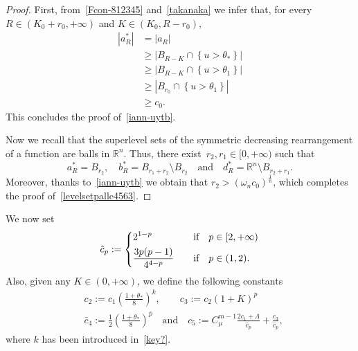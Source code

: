 \documentclass[12pt]{article}
\newcommand{\R}{\mathbb{R}}
\numberwithin{equation}{section}
\renewcommand{\geq}{\geqslant}
\begin{document}
\begin{proof}
First, from~\eqref{Fcon-812345} and~\eqref{takanaka} we infer that, for every~$R\in\left(K_0+r_0,+\infty\right)$ and $K\in (K_0,R-r_0)$,
\begin{equation*}
\begin{split}
\left|a_R^*\right| & =\left|a_R\right|\\ 
&\geq \left|B_{R-K}\cap \left\lbrace u>\theta_{*} \right\rbrace\right|\\
&\geq \left|B_{R-K}\cap \left\lbrace u>\theta_1 \right\rbrace\right|\\
&\geq \left|B_{r_0}\cap \left\lbrace u>\theta_1 \right\rbrace\right|\\
&\geq c_0. 
\end{split}
\end{equation*}
This concludes the proof of~\eqref{iann-uytb}. 

Now we recall that the superlevel sets of the symmetric decreasing rearrangement of a function are balls in $\R^n$. Thus, there exist~$r_2,r_1\in [0,+\infty)$ such that 
\begin{equation*}
a_R^*=B_{r_2}, \quad b_R^*=B_{r_1+r_2}\setminus B_{r_2}\quad\mbox{and}\quad d_R^*=\R^n\setminus B_{r_2+r_1}.
\end{equation*}
Moreover, thanks to~\eqref{iann-uytb} we obtain that $r_2> \left(\omega_n c_0\right)^\frac{1}{n}$, which completes the proof of~\eqref{levelsetpalle4563}. 
\end{proof}

We now set
\begin{equation}\label{red-g-poi}
\hat{c}_p:=\begin{dcases}
2^{1-p}\quad &\mbox{if}\quad p\in \left[2,+\infty\right)\\
\frac{3p(p-1)}{4^{4-p}}\quad &\mbox{if}\quad p\in (1,2). 
\end{dcases}
\end{equation} 
Also, given any $K\in (0,+\infty)$, we define the following constants 
\begin{equation}\label{c2-34566}
\begin{split}
&c_2:=c_1\left(\frac{1+\theta_*}{8}\right)^k, \quad\quad c_3:=c_2(1+K)^p\\
&\bar{c}_4:= \frac{1}{2} \left(\frac{1+\theta_*}{8}\right)^{\bar{p}}\quad\mbox{and}\quad c_5:=C_{\mu}^{m-1} \frac{2c_1+\Lambda}{\hat{c}_p}+\frac{c_3}{\hat{c}_p},  
\end{split}
\end{equation}
where $k$ has been introduced in~\eqref{key?}. 
\end{document}
